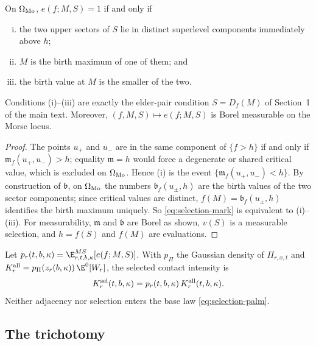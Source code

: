 \begin{lemma}\label{lem:selection-mark}
On $\Omega_{\rm Mo}$, $e(f;M,S)=1$ if and only if
\begin{enumerate}[(i)]
\item the two upper sectors of $S$ lie in distinct superlevel components immediately above $h$;
\item $M$ is the birth maximum of one of them; and
\item the birth value at $M$ is the smaller of the two.
\end{enumerate}
Conditions (i)--(iii) are exactly the elder-pair condition $S=D_f(M)$ of Section~1 of the main text. Moreover, $(f,M,S)\mapsto e(f;M,S)$ is Borel measurable on the Morse locus.
\end{lemma}

\begin{proof}
The points $u_+$ and $u_-$ are in the same component of $\{f>h\}$ if and only if $\mathfrak m_f(u_+,u_-)>h$; equality $\mathfrak m=h$ would force a degenerate or shared critical value, which is excluded on $\Omega_{\rm Mo}$. Hence (i) is the event $\{\mathfrak m_f(u_+,u_-)<h\}$. By construction of $\mathfrak b$, on $\Omega_{\rm Mo}$ the numbers $\mathfrak b_f(u_\pm,h)$ are the birth values of the two sector components; since critical values are distinct, $f(M)=\mathfrak b_f(u_\pm,h)$ identifies the birth maximum uniquely. So \eqref{eq:selection-mark} is equivalent to (i)--(iii). For measurability, $\mathfrak m$ and $\mathfrak b$ are Borel as shown, $v(S)$ is a measurable selection, and $h=f(S)$ and $f(M)$ are evaluations.
\end{proof}

\begin{definition}\label{def:selection-prob}
Let $p_r(t,b,\kappa)=\E^{MS}_{r,t,b,\kappa}[e(f;M,S)]$. With $p_\Pi$ the Gaussian density of $\Pi_{r,x,t}$ and $K^{\rm all}_r=p_\Pi(z_r(b,\kappa))\,\E^0[W_r]$, the selected contact intensity is
\begin{equation}\label{eq:selection-Ksel}
K^{\rm sel}_r(t,b,\kappa)=p_r(t,b,\kappa)\,K^{\rm all}_r(t,b,\kappa).
\end{equation}
Neither adjacency nor selection enters the base law \eqref{eq:selection-palm}.
\end{definition}

\subsection{The trichotomy}\label{ssec:selection-trichotomy}


